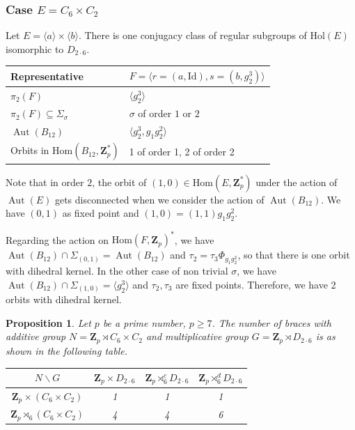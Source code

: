 \documentclass[12pt]{article}
\newtheorem{proposition}[theorem]{Proposition}
\theoremstyle{definition}
\newcommand{\Z}{\mathbf Z}
\newcommand{\Hol}{\mathrm{Hol}}
\newcommand{\Hom}{\mathrm{Hom}}
\newcommand{\Aut}{\operatorname{Aut}}
\begin{document}
\subsubsection*{Case $E=C_6\times C_2$}


Let $E=\langle a\rangle \times \langle b \rangle$. There is 
one conjugacy class of regular subgroups of $\Hol(E)$ isomorphic to $D_{2\cdot 6}$.


\begin{center}
    \begin{tabular}{|l|l|}
    \hline
      Representative& $F=\langle r=(a,\mathrm{Id}),s=(b,g_2^3)\rangle$ \\
      \hline
      $\pi_2(F)$& $ \langle g_2^3\rangle $\\
      $\pi_2(F)\subseteq \Sigma_{\sigma}$ &  $\sigma$ of order $1$ or $2$ \\
      $\Aut(B_{12})$ & $\langle g_2^3,g_1g_2^2\rangle$\\
      Orbits in $\Hom(B_{12},\Z_p^*)$ & 1 of order 1, 2 of order 2\\
      \hline
    \end{tabular}
\end{center}    
Note that in order $2$,  the orbit of $(1,0)\in \Hom(E,\Z_p^*)$ under the action of $\Aut(E)$ gets disconnected when we consider the action of $\Aut(B_{12})$. We have $(0,1)$ as fixed point and $(1,0)=(1,1)g_1g_2^2$.

Regarding the action on $\Hom(F,\Z_p)^*$,
we have $\Aut(B_{12})\cap \Sigma_{(0,1)}=\Aut(B_{12})$ and $\tau_2=\tau_3\Phi_{g_1g_2^2}$, so that there is one orbit with dihedral kernel. In the other case of non trivial $\sigma$, we have
$\Aut(B_{12})\cap \Sigma_{(1,0)}=\langle g_2^3\rangle$ and $\tau_2, \tau_3$
are fixed points. Therefore, we have 2 orbits with dihedral kernel.

\begin{proposition}
	Let $p$ be a prime number, $p\geq 7$.
	The number of braces with additive group $N=\Z_p \rtimes C_6\times C_2$ and multiplicative group $G=\Z_p\rtimes D_{2\cdot 6}$ is as shown in the following table.
	
	\begin{center}
		\begin{tabular}{|c||c|c|c|}
			\hline
			$N \backslash G$ & $\Z_p\times D_{2\cdot 6}$ & $\Z_p\rtimes_6^c D_{2\cdot 6} $ & $\Z_p\rtimes_6^d D_{2\cdot 6}$ \\
			\hline
			\hline
			$\Z_p\times (C_6\times C_2)$ & 1 & 1 & 1\\
			\hline
			$\Z_p\rtimes_6 (C_6\times C_2) $ & 4 & 4 & 6 \\
			\hline
		\end{tabular}
	\end{center}
\end{proposition}
\end{document}
